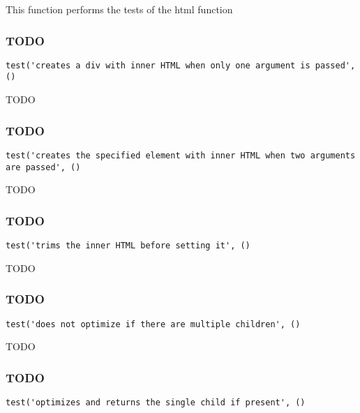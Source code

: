 \documentclass[a4paper]{article}
\begin{document}
This function performs the tests of the html function

\hypertarget{toc505}{}
\subsubsection{TODO}

\begin{lstlisting}
test('creates a div with inner HTML when only one argument is passed', ()
\end{lstlisting}

TODO

\hypertarget{toc506}{}
\subsubsection{TODO}

\begin{lstlisting}
test('creates the specified element with inner HTML when two arguments are passed', ()
\end{lstlisting}

TODO

\hypertarget{toc507}{}
\subsubsection{TODO}

\begin{lstlisting}
test('trims the inner HTML before setting it', ()
\end{lstlisting}

TODO

\hypertarget{toc508}{}
\subsubsection{TODO}

\begin{lstlisting}
test('does not optimize if there are multiple children', ()
\end{lstlisting}

TODO

\hypertarget{toc509}{}
\subsubsection{TODO}

\begin{lstlisting}
test('optimizes and returns the single child if present', ()
\end{lstlisting}
\end{document}
